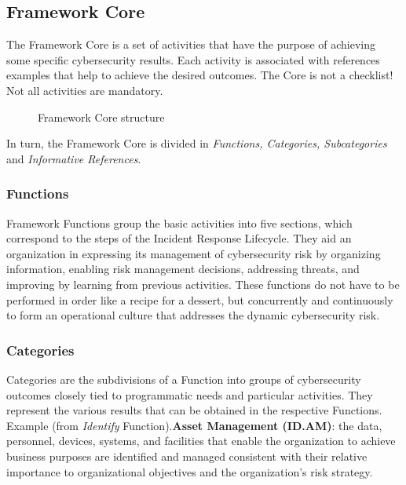 \subsection{Framework Core}
The Framework Core is a set of activities that have the purpose of achieving some specific cybersecurity results. Each activity is associated with references examples that help to achieve the desired outcomes. The Core is not a checklist! Not all activities are mandatory.
\begin{figure}[H]
  \centering
  
  \caption{Framework Core structure}
\end{figure}
\noindent
In turn, the Framework Core is divided in \textit{Functions, Categories, Subcategories} and \textit{Informative References}.
\subsubsection{Functions}
Framework Functions group the basic activities into five sections, which correspond to the steps of the Incident Response Lifecycle. They aid an organization in expressing its management of cybersecurity risk by organizing information, enabling risk management decisions, addressing threats, and improving by learning from previous activities. These functions do not have to be performed in order like a recipe for a dessert, but concurrently and continuously to form an operational culture that addresses the dynamic cybersecurity risk.
\subsubsection{Categories}
Categories are the subdivisions of a Function into groups of cybersecurity outcomes closely tied to programmatic needs and particular activities. They represent the various results that can be obtained in the respective Functions. Example (from \textit{Identify} Function).\newline\textbf{Asset Management (ID.AM)}: the data, personnel, devices, systems, and facilities that enable the organization to achieve business purposes are identified and managed consistent with their relative importance to organizational objectives and the organization’s risk strategy.
